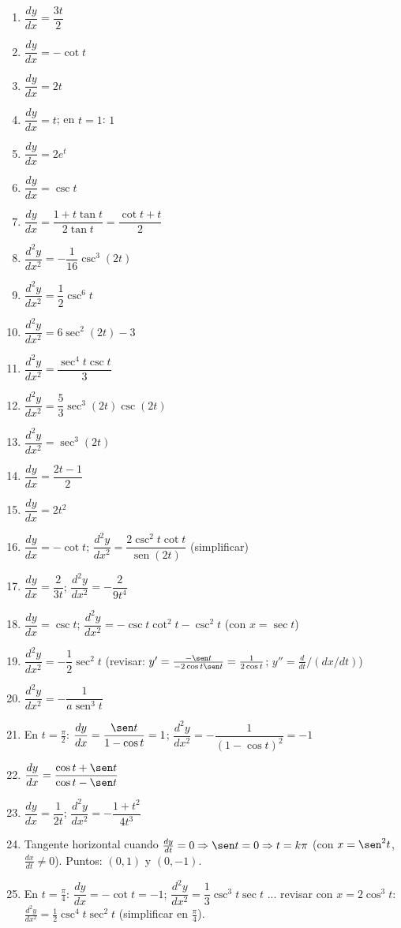 \documentclass[12pt, letterpaper]{article}
\begin{document}
  \begin{enumerate}[leftmargin=*, label=\textbf{\arabic*.}]
    \item $\dfrac{dy}{dx} = \dfrac{3t}{2}$
    \item $\dfrac{dy}{dx} = -\cot t$
    \item $\dfrac{dy}{dx} = 2t$
    \item $\dfrac{dy}{dx} = t$; en $t=1$: $1$
    \item $\dfrac{dy}{dx} = 2e^{t}$
    \item $\dfrac{dy}{dx} = \csc t$
    \item $\dfrac{dy}{dx} = \dfrac{1 + t\tan t}{2\tan t} = \dfrac{\cot t + t}{2}$
    \item $\dfrac{d^2y}{dx^2} = -\dfrac{1}{16}\csc^3(2t)$ \checkmark
    \item $\dfrac{d^2y}{dx^2} = \dfrac{1}{2}\csc^6 t$ \checkmark
    \item $\dfrac{d^2y}{dx^2} = 6\sec^2(2t) - 3$ \checkmark
    \item $\dfrac{d^2y}{dx^2} = \dfrac{\sec^4 t\csc t}{3}$ \checkmark
    \item $\dfrac{d^2y}{dx^2} = \dfrac{5}{3}\sec^3(2t)\csc(2t)$ \checkmark
    \item $\dfrac{d^2y}{dx^2} = \sec^3(2t)$ \checkmark
    \item $\dfrac{dy}{dx} = \dfrac{2t-1}{2}$
    \item $\dfrac{dy}{dx} = 2t^2$
    \item $\dfrac{dy}{dx} = -\cot t$; $\dfrac{d^2y}{dx^2} = \dfrac{2\csc^2 t\cot t}{\operatorname{sen}(2t)}$ (simplificar)
    \item $\dfrac{dy}{dx} = \dfrac{2}{3t}$; $\dfrac{d^2y}{dx^2} = -\dfrac{2}{9t^4}$
    \item $\dfrac{dy}{dx} = \csc t$; $\dfrac{d^2y}{dx^2} = -\csc t\cot^2 t - \csc^2 t$ (con $x=\sec t$)
    \item $\dfrac{d^2y}{dx^2} = -\dfrac{1}{2}\sec^2 t$ (revisar: $y'=\frac{-\sen t}{-2\cos t\sen t}=\frac{1}{2\cos t}$; $y''=\frac{d}{dt}/(dx/dt)$)
    \item $\dfrac{d^2y}{dx^2} = -\dfrac{1}{a\operatorname{sen}^3 t}$ \checkmark
    \item En $t = \frac{\pi}{2}$: $\dfrac{dy}{dx} = \dfrac{\sen t}{1-\cos t} = 1$; $\dfrac{d^2y}{dx^2} = -\dfrac{1}{(1-\cos t)^2} = -1$
    \item $\dfrac{dy}{dx} = \dfrac{\cos t + \sen t}{\cos t - \sen t}$
    \item $\dfrac{dy}{dx} = \dfrac{1}{2t}$; $\dfrac{d^2y}{dx^2} = -\dfrac{1+t^2}{4t^3}$
    \item Tangente horizontal cuando $\frac{dy}{dt} = 0 \Rightarrow \sen t = 0 \Rightarrow t = k\pi$ (con $x=\sen^2 t$, $\frac{dx}{dt}\neq 0$). Puntos: $(0,1)$ y $(0,-1)$.
    \item En $t = \frac{\pi}{4}$: $\dfrac{dy}{dx} = -\cot t = -1$; $\dfrac{d^2y}{dx^2} = \dfrac{1}{3}\csc^3 t\sec t$ ... revisar con $x=2\cos^3 t$: $\frac{d^2y}{dx^2} = \frac{1}{2}\csc^4 t\sec^2 t$ (simplificar en $\frac{\pi}{4}$).

  \end{enumerate}
\fi
\end{document}

